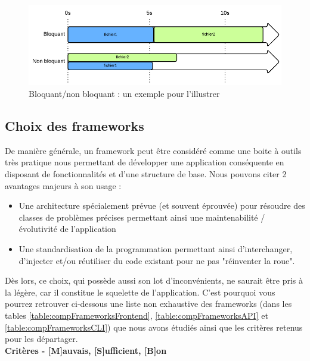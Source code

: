 \begin{figure}[H]
    \includegraphics[width=\textwidth,height=0.25\textheight,keepaspectratio]{images/choixTechnologiques/ComparaisonBloquantOuNon.png}
    \centering
    \caption[Bloquant/non bloquant : un exemple pour l'illustrer]{Bloquant/non bloquant : un exemple pour l'illustrer~\cite{NodejsIllustrations}}
    \label{pic:BloquantOrNot}
\end{figure}

\pagebreak

\subsection*{Choix des frameworks}

De manière générale, un framework peut être considéré comme une boite à outils très pratique nous permettant de développer une application conséquente en disposant de fonctionnalités et d'une structure de base. Nous pouvons citer 2 avantages majeurs à son usage : 
\begin{itemize}
    \item Une architecture spécialement prévue (et souvent éprouvée) pour résoudre des classes de problèmes précises permettant ainsi une maintenabilité / évolutivité  de l'application
    \item Une standardisation de la programmation permettant ainsi d'interchanger, d'injecter et/ou réutiliser du code existant pour ne pas "réinventer la roue".
\end{itemize}
Dès lors, ce choix, qui possède aussi son lot d'inconvénients, ne saurait être pris à la légère, car il constitue le squelette de l'application. C'est pourquoi vous pourrez retrouver ci-dessous une liste non exhaustive des frameworks (dans les tables \ref{table:compFrameworksFrontend}, \ref{table:compFrameworksAPI} et \ref{table:compFrameworksCLI}) que nous avons étudiés ainsi que les critères retenus pour les départager. \\

\noindent\textbf{Critères - [M]auvais, [S]ufficient, [B]on}

